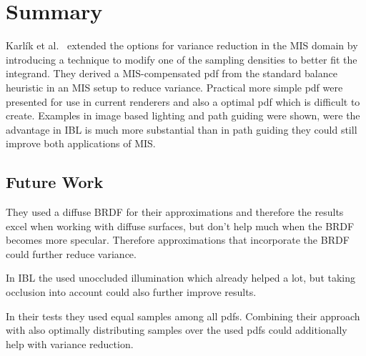 \chapter{Summary}
\label{ch:summary}
Karl\'ik et al.~\cite{Karlik2019} extended the options for variance reduction in the MIS domain
by introducing a technique to modify one of the sampling densities to better fit the integrand.
They derived a MIS-compensated pdf from the standard balance heuristic in an MIS setup to reduce variance.
Practical more simple pdf were presented for use in current renderers
and also a optimal pdf which is difficult to create.
Examples in image based lighting and path guiding were shown,
were the advantage in IBL is much more substantial than in path guiding they could still improve both applications of MIS.


\section{Future Work}
\label{sec:future_work}
They used a diffuse BRDF for their approximations and therefore the results excel when working with diffuse surfaces,
but don't help much when the BRDF becomes more specular.
Therefore approximations that incorporate the BRDF could further reduce variance.

In IBL the used unoccluded illumination which already helped a lot,
but taking occlusion into account could also further improve results.

In their tests they used equal samples among all pdfs.
Combining their approach with also optimally distributing samples over the used pdfs could additionally help with variance reduction.